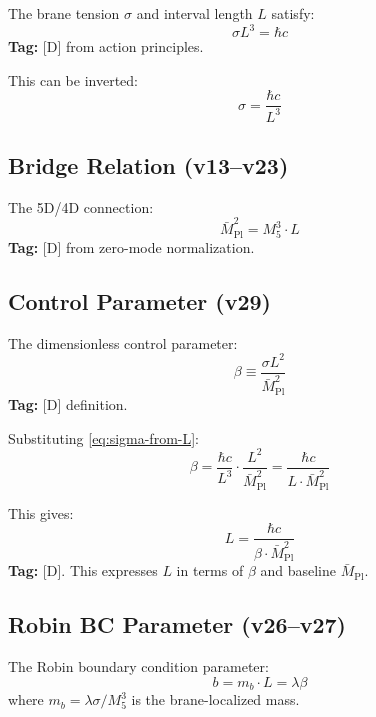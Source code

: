 \documentclass[11pt,a4paper]{article}
\begin{document}
The brane tension $\sigma$ and interval length $L$ satisfy:
\begin{equation}
  \boxed{\sigma L^3 = \hbar c}
  \label{eq:metrological-anchor}
\end{equation}
\textbf{Tag:} [D] from action principles.

This can be inverted:
\begin{equation}
  \sigma = \frac{\hbar c}{L^3}
  \label{eq:sigma-from-L}
\end{equation}

\subsection{Bridge Relation (v13--v23)}

The 5D/4D connection:
\begin{equation}
  \boxed{\bar{M}_{\text{Pl}}^2 = M_5^3 \cdot L}
  \label{eq:bridge}
\end{equation}
\textbf{Tag:} [D] from zero-mode normalization.

\subsection{Control Parameter (v29)}

The dimensionless control parameter:
\begin{equation}
  \boxed{\beta \equiv \frac{\sigma L^2}{\bar{M}_{\text{Pl}}^2}}
  \label{eq:beta-def}
\end{equation}
\textbf{Tag:} [D] definition.

Substituting \eqref{eq:sigma-from-L}:
\begin{equation}
  \beta = \frac{\hbar c}{L^3} \cdot \frac{L^2}{\bar{M}_{\text{Pl}}^2}
        = \frac{\hbar c}{L \cdot \bar{M}_{\text{Pl}}^2}
  \label{eq:beta-from-L}
\end{equation}

This gives:
\begin{equation}
  \boxed{L = \frac{\hbar c}{\beta \cdot \bar{M}_{\text{Pl}}^2}}
  \label{eq:L-from-beta}
\end{equation}
\textbf{Tag:} [D]. This expresses $L$ in terms of $\beta$ and baseline $\bar{M}_{\text{Pl}}$.

\subsection{Robin BC Parameter (v26--v27)}

The Robin boundary condition parameter:
\begin{equation}
  b = m_b \cdot L = \lambda \beta
  \label{eq:b-def}
\end{equation}
where $m_b = \lambda \sigma / M_5^3$ is the brane-localized mass.
\end{document}
